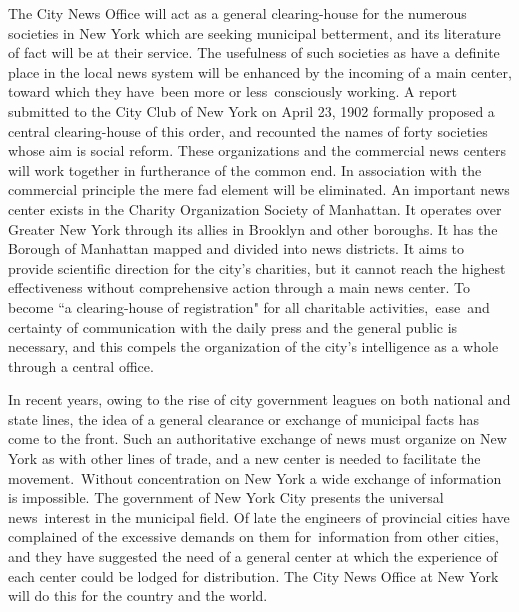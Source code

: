 \documentclass[openany,nobib]{tufte-book}
\begin{document}
The City News Office will act as a general clearing-house for the
numerous societies in New York which are seeking municipal betterment,
and its literature of fact will be at their service. The usefulness of
such societies as have a definite place in the local news system will be
enhanced by the incoming of a main center, toward which they have~been
more or less~consciously working. A report submitted to the City Club of
New York on April 23, 1902 formally proposed a central clearing-house of
this order, and recounted the names of forty societies whose aim is
social reform. These organizations and the commercial news centers will
work together in furtherance of the common end. In association with the
commercial principle the mere fad element will be eliminated. An
important news center exists in the Charity Organization Society of
Manhattan. It operates over Greater New York through its allies in
Brooklyn and other boroughs. It has the Borough of Manhattan mapped and
divided into news districts. It aims to provide scientific direction for
the city's charities, but it cannot reach the highest effectiveness
without comprehensive action through a main news center. To become ``a
clearing-house of registration" for all charitable activities,~ease~and
certainty of communication with the daily press and the general public
is necessary, and this compels the organization of the city's
intelligence as a whole through a central office.~

In recent years, owing to the rise of city government leagues on both
national and state lines, the idea of a general clearance or exchange of
municipal facts has come to the front. Such an authoritative exchange of
news must organize on New York as with other lines of trade, and a new
center is needed to facilitate the movement.~Without concentration on
New York a wide exchange of information is impossible. The government of
New York City presents the universal news~interest in the municipal
field. Of late the engineers of provincial cities have complained of the
excessive demands on them for~information from other cities, and they
have suggested the need of a general center at which the experience of
each center could be lodged for distribution. The City News Office at
New York will do this for the country and the world.~
\end{document}
